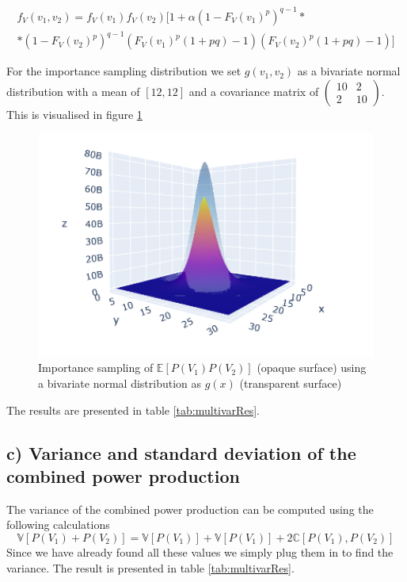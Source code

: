 \documentclass[a4paper]{article}
\begin{document}
\begin{equation}
    \begin{gathered}
    f_V(v_1, v_2) = f_V(v_1)f_V(v_2)[1 + \alpha(1-F_V(v_1)^p)^{q-1} * \\ * (1-F_V(v_2)^p)^{q-1}(F_V(v_1)^p(1+pq)-1)(F_V(v_2)^p(1+pq)-1)]
    \end{gathered}
\end{equation}

For the importance sampling distribution we set $g(v_1, v_2)$ as a bivariate normal distribution with a mean of $[12,12]$ and a covariance matrix of 
$\begin{pmatrix} 
    10 & 2 \\ 
    2 & 10 
\end{pmatrix}$. This is visualised in figure \ref{fig:mtBruno}

\begin{figure}[H]
    \centering
    \includegraphics[width = 1.0\textwidth]{images/mtBruno}
    \caption{Importance sampling of $\mathbb{E}[P(V_1)P(V_2)]$ (opaque surface) using a bivariate normal distribution as $g(x)$ (transparent surface)}
    \label{fig:mtBruno}
\end{figure}


The results are presented in table \ref{tab:multivarRes}.

\subsection*{c) Variance and standard deviation of the combined power production}
The variance of the combined power production can be computed using the following calculations
\begin{equation}
    \mathbb{V}[P(V_1) + P(V_2)] = \mathbb{V}[P(V_1)] + \mathbb{V}[P(V_1)] + 2\mathbb{C}[P(V_1), P(V_2)]
\end{equation}
Since we have already found all these values we simply plug them in to find the variance. The result is presented in table \ref{tab:multivarRes}.
\end{document}
